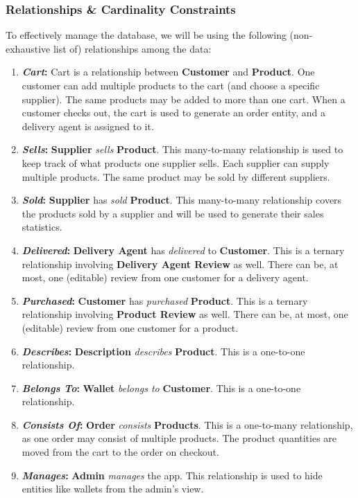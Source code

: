 \documentclass[12pt]{report}
\begin{document}
    \subsubsection*{Relationships \& Cardinality Constraints}
    To effectively manage the database, we will be using the following (non-exhaustive list of) relationships among the data:
    \begin{enumerate}
        \item \textbf{\textit{Cart}:}
        Cart is a relationship between \textbf{Customer} and \textbf{Product}.
        One customer can add multiple products to the cart (and choose a specific supplier).
        The same products may be added to more than one cart. When a customer checks out, the cart is used to generate an order entity, and a delivery agent is assigned to it.
        \item \textbf{\textit{Sells}:}
        \textbf{Supplier} \textit{sells} \textbf{Product}.
        This many-to-many relationship is used to keep track of what products one supplier sells.
        Each supplier can supply multiple products. The same product may be sold by different suppliers.
        \item \textbf{\textit{Sold}:}
        \textbf{Supplier} has \textit{sold} \textbf{Product}.
        This many-to-many relationship covers the products sold by a supplier and will be used to generate their sales statistics.
        \item \textbf{\textit{Delivered}:}
        \textbf{Delivery Agent} has \textit{delivered} to \textbf{Customer}.
        This is a ternary relationship involving \textbf{Delivery Agent Review} as well.
        There can be, at most, one (editable) review from one customer for a delivery agent.
        \item \textbf{\textit{Purchased}:}
        \textbf{Customer} has \textit{purchased} \textbf{Product}.
        This is a ternary relationship involving \textbf{Product Review} as well.
        There can be, at most, one (editable) review from one customer for a product.
        \item \textbf{\textit{Describes}:}
        \textbf{Description} \textit{describes} \textbf{Product}.
        This is a one-to-one relationship.
        \item \textbf{\textit{Belongs To}:}
        \textbf{Wallet} \textit{belongs to} \textbf{Customer}.
        This is a one-to-one relationship.
        \item \textbf{\textit{Consists Of}:}
        \textbf{Order} \textit{consists} \textbf{Products}.
        This is a one-to-many relationship, as one order may consist of multiple products. The product quantities are moved from the cart to the order on checkout.
        \item \textbf{\textit{Manages}:}
        \textbf{Admin} \textit{manages} the app.
        This relationship is used to hide entities like wallets from the admin's view.
    \end{enumerate}
\end{document}
